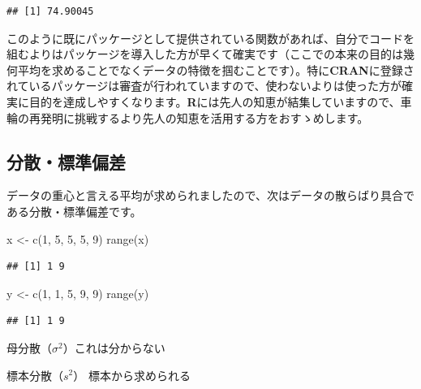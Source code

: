 \documentclass[
  12pt,
]{book}
\newenvironment{Shaded}{\begin{snugshade}}{\end{snugshade}}
\newcommand{\DecValTok}[1]{\textcolor[rgb]{0.00,0.00,0.81}{#1}}
\newcommand{\FunctionTok}[1]{\textcolor[rgb]{0.00,0.00,0.00}{#1}}
\newcommand{\NormalTok}[1]{#1}
\newcommand{\OtherTok}[1]{\textcolor[rgb]{0.56,0.35,0.01}{#1}}
\begin{document}
\begin{verbatim}
## [1] 74.90045
\end{verbatim}

このように既にパッケージとして提供されている関数があれば、自分でコードを組むよりはパッケージを導入した方が早くて確実です（ここでの本来の目的は幾何平均を求めることでなくデータの特徴を掴むことです）。特に\textbf{CRAN}に登録されているパッケージは審査が行われていますので、使わないよりは使った方が確実に目的を達成しやすくなります。\textbf{R}には先人の知恵が結集していますので、車輪の再発明に挑戦するより先人の知恵を活用する方をおすゝめします。

\hypertarget{ux5206ux6563ux6a19ux6e96ux504fux5dee}{%
\subsection{分散・標準偏差}\label{ux5206ux6563ux6a19ux6e96ux504fux5dee}}

データの重心と言える平均が求められましたので、次はデータの散らばり具合である分散・標準偏差です。

\begin{Shaded}
\begin{Highlighting}[]
\NormalTok{x }\OtherTok{\textless{}{-}} \FunctionTok{c}\NormalTok{(}\DecValTok{1}\NormalTok{, }\DecValTok{5}\NormalTok{, }\DecValTok{5}\NormalTok{, }\DecValTok{5}\NormalTok{, }\DecValTok{9}\NormalTok{)}
\FunctionTok{range}\NormalTok{(x)}
\end{Highlighting}
\end{Shaded}

\begin{verbatim}
## [1] 1 9
\end{verbatim}

\begin{Shaded}
\begin{Highlighting}[]
\NormalTok{y }\OtherTok{\textless{}{-}} \FunctionTok{c}\NormalTok{(}\DecValTok{1}\NormalTok{, }\DecValTok{1}\NormalTok{, }\DecValTok{5}\NormalTok{, }\DecValTok{9}\NormalTok{, }\DecValTok{9}\NormalTok{)}
\FunctionTok{range}\NormalTok{(y)}
\end{Highlighting}
\end{Shaded}

\begin{verbatim}
## [1] 1 9
\end{verbatim}

母分散（\(\sigma^2\)）これは分からない

標本分散（\(s^2\)） 標本から求められる
\end{document}
